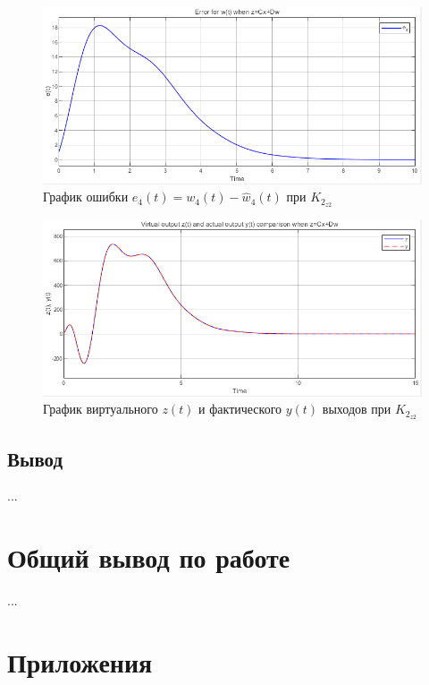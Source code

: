 \documentclass[a4paper, 12pt]{article}
\begin{document}
    \begin{figure}[H]
        \centering
        \includegraphics[scale=0.75]{3task_we4cd.png}
        \captionsetup{skip=0pt}
        \caption{График ошибки $e_4(t)=w_4(t)-\hat{w}_4(t)$ при $K_{2_{z2}}$}
        \label{fig:3task_we4cd}
    \end{figure}
    \begin{figure}[H]
        \centering
        \includegraphics[scale=0.75]{3task_zcd.png}
        \captionsetup{skip=0pt}
        \caption{График виртуального $z(t)$ и фактического $y(t)$ выходов при $K_{2_{z2}}$}
        \label{fig:3task_zcd}
    \end{figure}


    \subsection{Вывод}
    ...


    \section{Общий вывод по работе}
    ...


    \section{Приложения}
\end{document}

